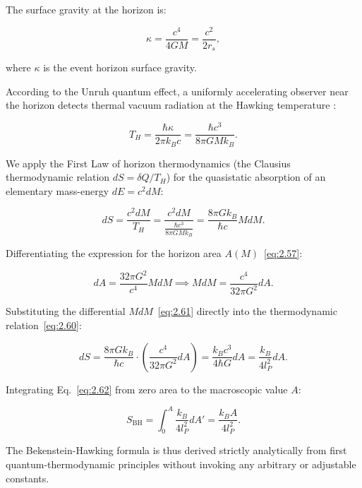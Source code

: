 \documentclass[11pt,a4paper]{article}
\theoremstyle{definition}
\begin{document}
The surface gravity at the horizon is:

\begin{equation}\label{eq:2.58}\tag{2.58}
\kappa = \frac{c^4}{4GM} = \frac{c^2}{2 r_s},
\end{equation}

where $\kappa$ is the event horizon surface gravity.

According to the Unruh quantum effect, a uniformly accelerating observer near the horizon detects thermal vacuum radiation at the Hawking temperature \cite{ref18}:

\begin{equation}\label{eq:2.59}\tag{2.59}
T_H = \frac{\hbar \kappa}{2\pi k_B c} = \frac{\hbar c^3}{8\pi G M k_B}.
\end{equation}

We apply the First Law of horizon thermodynamics (the Clausius thermodynamic relation $dS = \delta Q / T_H$) for the quasistatic absorption of an elementary mass-energy $dE = c^2 dM$:

\begin{equation}\label{eq:2.60}\tag{2.60}
dS = \frac{c^2 dM}{T_H} = \frac{c^2 dM}{\frac{\hbar c^3}{8\pi G M k_B}} = \frac{8\pi G k_B}{\hbar c} M dM.
\end{equation}

Differentiating the expression for the horizon area $A(M)$~\eqref{eq:2.57}:

\begin{equation}\label{eq:2.61}\tag{2.61}
dA = \frac{32\pi G^2}{c^4} M dM \implies M dM = \frac{c^4}{32\pi G^2} dA.
\end{equation}

Substituting the differential $M dM$~\eqref{eq:2.61} directly into the thermodynamic relation~\eqref{eq:2.60}:

\begin{equation}\label{eq:2.62}\tag{2.62}
dS = \frac{8\pi G k_B}{\hbar c} \cdot \left( \frac{c^4}{32\pi G^2} dA \right) = \frac{k_B c^3}{4 \hbar G} dA = \frac{k_B}{4 l_P^2} dA.
\end{equation}

Integrating Eq.~\eqref{eq:2.62} from zero area to the macroscopic value $A$:

\begin{equation}\label{eq:2.63}\tag{2.63}
S_{\text{BH}} = \int_0^A \frac{k_B}{4 l_P^2} dA' = \frac{k_B A}{4 l_P^2}.
\end{equation}

The Bekenstein-Hawking formula is thus derived strictly analytically from first quantum-thermodynamic principles without invoking any arbitrary or adjustable constants.
\end{document}
